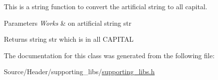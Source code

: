This is a string function to convert the artificial string to all capital. 


\begin{DoxyParams}{Parameters}
{\em Works} & on artificial string str \\
\hline
\end{DoxyParams}
\begin{DoxyReturn}{Returns}
string str which is in all C\+A\+P\+I\+T\+AL 
\end{DoxyReturn}


The documentation for this class was generated from the following file\+:\begin{DoxyCompactItemize}
\item 
Source/\+Header/supporting\+\_\+libs/\hyperlink{supporting__libs_8h}{supporting\+\_\+libs.\+h}\end{DoxyCompactItemize}
